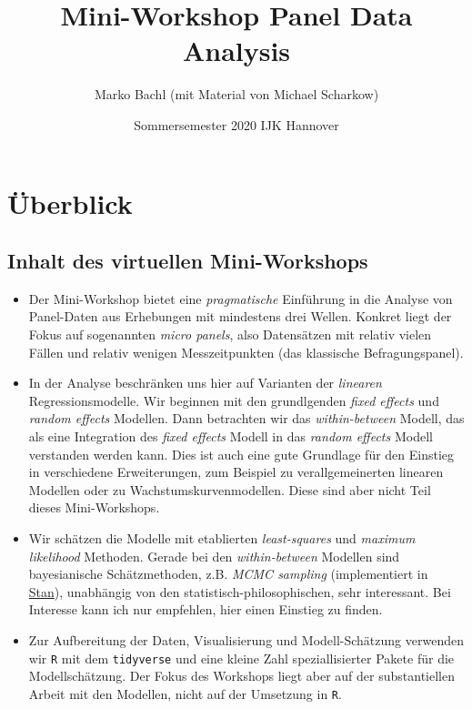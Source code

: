 \documentclass[]{book}
\title{Mini-Workshop Panel Data Analysis}
\author{Marko Bachl (mit Material von Michael Scharkow)}
\date{Sommersemester 2020 \textbar{} IJK Hannover}
\begin{document}
\maketitle

{
\setcounter{tocdepth}{1}
\tableofcontents
}
\hypertarget{uxfcberblick}{%
\chapter{Überblick}\label{uxfcberblick}}

\hypertarget{inhalt-des-virtuellen-mini-workshops}{%
\section{Inhalt des virtuellen Mini-Workshops}\label{inhalt-des-virtuellen-mini-workshops}}

\begin{itemize}
\item
  Der Mini-Workshop bietet eine \emph{pragmatische} Einführung in die Analyse von Panel-Daten aus Erhebungen mit mindestens drei Wellen. Konkret liegt der Fokus auf sogenannten \emph{micro panels}, also Datensätzen mit relativ vielen Fällen und relativ wenigen Messzeitpunkten (das klassische Befragungspanel).
\item
  In der Analyse beschränken uns hier auf Varianten der \emph{linearen} Regressionsmodelle. Wir beginnen mit den grundlgenden \emph{fixed effects} und \emph{random effects} Modellen. Dann betrachten wir das \emph{within-between} Modell, das als eine Integration des \emph{fixed effects} Modell in das \emph{random effects} Modell verstanden werden kann. Dies ist auch eine gute Grundlage für den Einstieg in verschiedene Erweiterungen, zum Beispiel zu verallgemeinerten linearen Modellen oder zu Wachstumskurvenmodellen. Diese sind aber nicht Teil dieses Mini-Workshops.
\item
  Wir schätzen die Modelle mit etablierten \emph{least-squares} und \emph{maximum likelihood} Methoden. Gerade bei den \emph{within-between} Modellen sind bayesianische Schätzmethoden, z.B. \emph{MCMC sampling} (implementiert in \href{https://mc-stan.org/}{Stan}), unabhängig von den statistisch-philosophischen, sehr interessant. Bei Interesse kann ich nur empfehlen, hier einen Einstieg zu finden.
\item
  Zur Aufbereitung der Daten, Visualisierung und Modell-Schätzung verwenden wir \texttt{R} mit dem \texttt{tidyverse} und eine kleine Zahl speziallisierter Pakete für die Modellschätzung. Der Fokus des Workshops liegt aber auf der substantiellen Arbeit mit den Modellen, nicht auf der Umsetzung in \texttt{R}.
\end{itemize}
\end{document}
